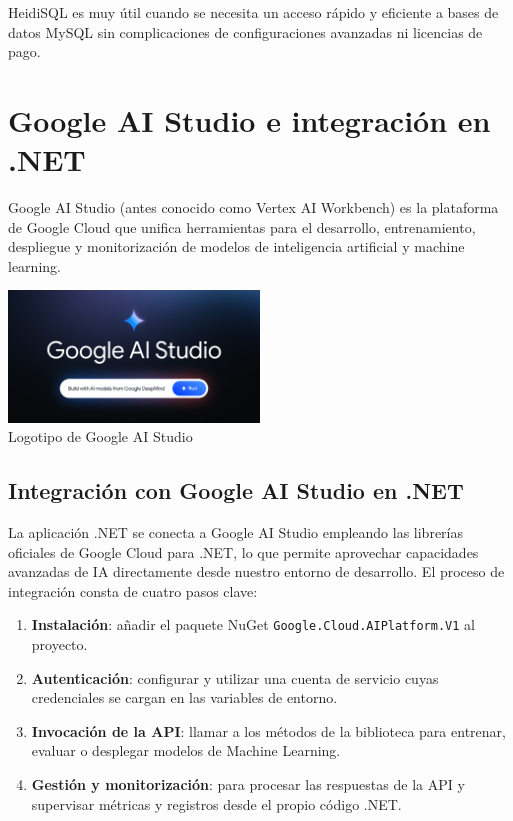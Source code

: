 HeidiSQL es muy útil cuando se necesita un acceso rápido y eficiente a bases de datos MySQL sin complicaciones de configuraciones avanzadas ni licencias de pago.

\section{Google AI Studio e integración en .NET}\label{google-ai-studio}
Google AI Studio (antes conocido como Vertex AI Workbench) es la plataforma de Google Cloud que unifica herramientas para el desarrollo, entrenamiento, despliegue y monitorización de modelos de inteligencia artificial y machine learning. 

\begin{center}
  \includegraphics[width=0.5\textwidth]{img/ai-studio-logo.png}\\
  \small Logotipo de Google AI Studio
\end{center}

\subsection{Integración con Google AI Studio en .NET}

La aplicación .NET se conecta a Google AI Studio empleando las librerías oficiales de Google Cloud para .NET, lo que permite aprovechar capacidades avanzadas de IA directamente desde nuestro entorno de desarrollo. El proceso de integración consta de cuatro pasos clave:

\begin{enumerate}
  \item \textbf{Instalación}: añadir el paquete NuGet  
    \texttt{Google.Cloud.AIPlatform.V1} al proyecto.
  \item \textbf{Autenticación}: configurar y utilizar una cuenta de servicio  
    cuyas credenciales se cargan en las variables de entorno.
  \item \textbf{Invocación de la API}: llamar a los métodos de la biblioteca  
    para entrenar, evaluar o desplegar modelos de Machine Learning.
  \item \textbf{Gestión y monitorización}: para procesar las respuestas de la API y supervisar métricas y registros desde el propio código .NET.
\end{enumerate}

